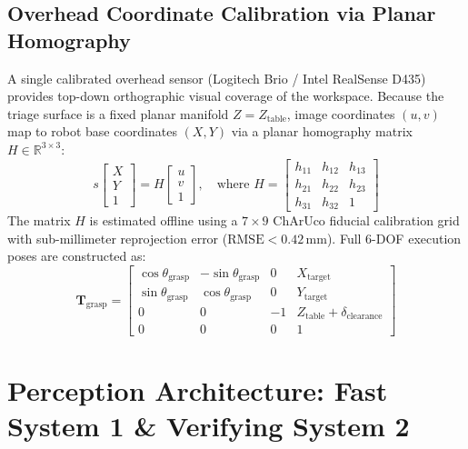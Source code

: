 \documentclass[10pt,a4paper]{article}
\begin{document}
\subsection{Overhead Coordinate Calibration via Planar Homography}
A single calibrated overhead sensor (Logitech Brio / Intel RealSense D435) provides top-down orthographic visual coverage of the workspace. Because the triage surface is a fixed planar manifold $Z = Z_{\text{table}}$, image coordinates $(u, v)$ map to robot base coordinates $(X, Y)$ via a planar homography matrix $H \in \mathbb{R}^{3\times3}$:
\begin{equation}
    s \begin{bmatrix} X \\ Y \\ 1 \end{bmatrix} = H \begin{bmatrix} u \\ v \\ 1 \end{bmatrix}, \quad \text{where } H = \begin{bmatrix} h_{11} & h_{12} & h_{13} \\ h_{21} & h_{22} & h_{23} \\ h_{31} & h_{32} & 1 \end{bmatrix}
\end{equation}
The matrix $H$ is estimated offline using a $7\times9$ ChArUco fiducial calibration grid with sub-millimeter reprojection error ($\text{RMSE} < 0.42\,\text{mm}$). Full 6-DOF execution poses are constructed as:
\begin{equation}
    \mathbf{T}_{\text{grasp}} = \begin{bmatrix} 
    \cos\theta_{\text{grasp}} & -\sin\theta_{\text{grasp}} & 0 & X_{\text{target}} \\
    \sin\theta_{\text{grasp}} & \cos\theta_{\text{grasp}} & 0 & Y_{\text{target}} \\
    0 & 0 & -1 & Z_{\text{table}} + \delta_{\text{clearance}} \\
    0 & 0 & 0 & 1 
    \end{bmatrix}
\end{equation}

\section{Perception Architecture: Fast System 1 \& Verifying System 2}
\end{document}
